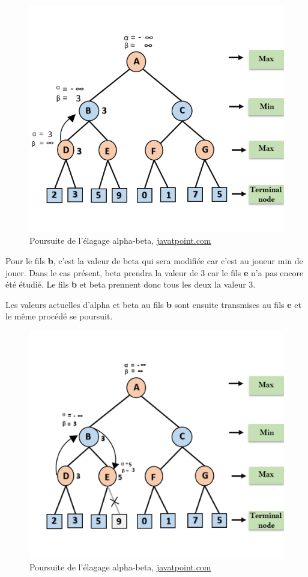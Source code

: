 \documentclass{article}
\begin{document}
\begin{figure}[!h]
\centering
\includegraphics[scale=0.6]{img/alpha-beta-pruning-step3.png}
\caption{Poursuite de l'élagage alpha-beta,
\href{https://www.javatpoint.com/ai-alpha-beta-pruning}{javatpoint.com}}
\end{figure}

Pour le fils \textbf{b}, c'est la valeur de beta qui sera modifiée car c'est au joueur min de jouer. Dans le cas présent, beta prendra la valeur de 3 car le fils \textbf{e} n'a pas encore été étudié. Le fils \textbf{b} et beta prennent donc tous les deux la valeur 3.

Les valeurs actuelles d'alpha et beta au fils \textbf{b} sont ensuite transmises au fils \textbf{e} et le même procédé se poursuit.

\begin{figure}[!h]
\centering
\includegraphics[scale=0.7]{img/alpha-beta-pruning-step4.png}
\caption{Poursuite de l'élagage alpha-beta,
\href{https://www.javatpoint.com/ai-alpha-beta-pruning}{javatpoint.com}}
\end{figure}
\end{document}
